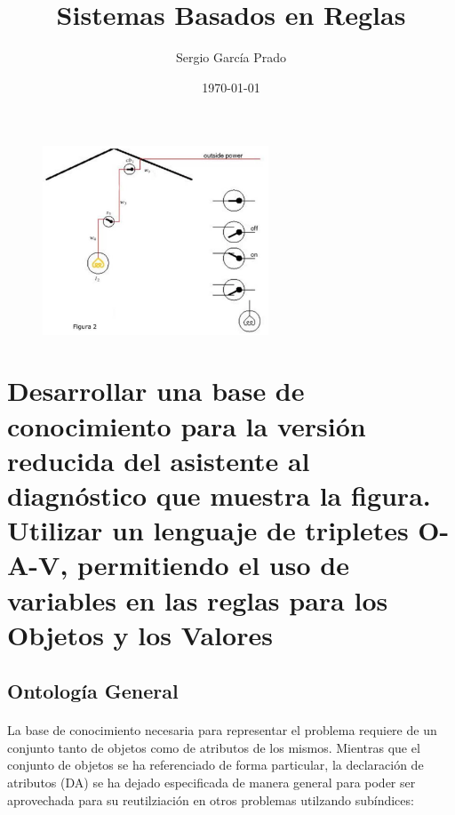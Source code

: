 \documentclass[10pt, a4paper,spanish]{article}
\title{\vspace{-15mm}\fontsize{24pt}{10pt}\selectfont\textbf{Sistemas Basados en Reglas}} %
\author{Sergio García Prado}
\date{\today}
\begin{document}
	\maketitle %

	\thispagestyle{fancy} %


	\begin{figure}[H]
		\begin{center}
			\includegraphics[width=0.6\textwidth]{diagnostic-assistant}
		\end{center}
	\end{figure}


	\section{Desarrollar una base de conocimiento para la versión reducida del asistente al diagnóstico que muestra la figura. Utilizar un lenguaje de tripletes O-A-V, permitiendo el uso de variables en las reglas para los Objetos y los Valores}

		\subsection{Ontología General}

			\paragraph{}
			La base de conocimiento necesaria para representar el problema requiere de un conjunto tanto de objetos como de atributos de los mismos. Mientras que el conjunto de objetos se ha referenciado de forma particular, la declaración de atributos (DA) se ha dejado especificada de manera general para poder ser aprovechada para su reutilziación en otros problemas utilzando subíndices:
\end{document}
